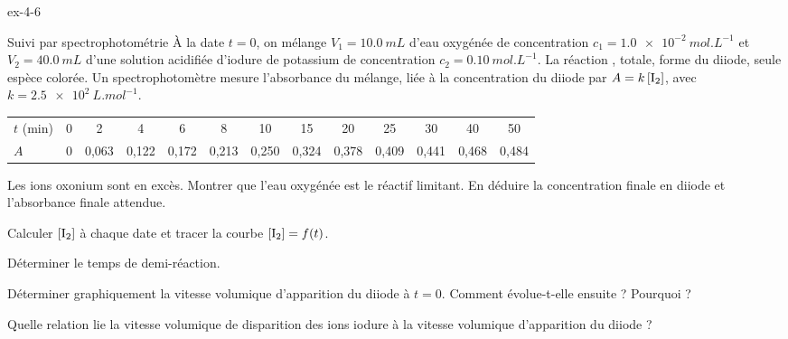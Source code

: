 \begin{blocLivre}{ex-4-6}
\begin{exercice}[2]{Suivi par spectrophotométrie}
À la date $t=0$, on mélange $V_1=\qty{10,0}{mL}$ d'eau oxygénée de concentration $c_1=\qty{1,0e-2}{mol.L^{-1}}$ et
$V_2=\qty{40,0}{mL}$ d'une solution acidifiée d'iodure de potassium de concentration $c_2=\qty{0,10}{mol.L^{-1}}$.
La réaction , totale, forme du diiode, seule espèce colorée. Un spectrophotomètre
mesure l'absorbance du mélange, liée à la concentration du diiode par $A=k\,[\ce{I2}]$, avec $k=\qty{2,5e2}{L.mol^{-1}}$.
\begin{center}\small\renewcommand{\arraystretch}{1.2}
\begin{tabular}{@{}l*{12}{c}@{}}\toprule
$t$ (min) & 0 & 2 & 4 & 6 & 8 & 10 & 15 & 20 & 25 & 30 & 40 & 50\\
$A$ & 0 & 0,063 & 0,122 & 0,172 & 0,213 & 0,250 & 0,324 & 0,378 & 0,409 & 0,441 & 0,468 & 0,484\\\bottomrule
\end{tabular}\end{center}
\begin{questions}
\item Les ions oxonium sont en excès. Montrer que l'eau oxygénée est le réactif limitant. En déduire la concentration
finale en diiode et l'absorbance finale attendue.
\item Calculer $[\ce{I2}]$ à chaque date et tracer la courbe $[\ce{I2}]=f(t)$.
\item Déterminer le temps de demi-réaction.
\item Déterminer graphiquement la vitesse volumique d'apparition du diiode à $t=0$. Comment évolue-t-elle ensuite ? Pourquoi ?
\item Quelle relation lie la vitesse volumique de disparition des ions iodure à la vitesse volumique d'apparition du diiode ?
\end{questions}
\end{exercice}
\end{blocLivre}
